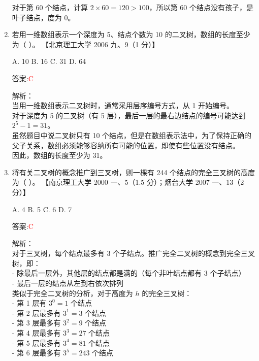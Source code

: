 \documentclass[lang=cn,newtx,10pt,scheme=chinese]{../../../elegantbook}
\begin{document}
\begin{enumerate}
    对于第 60 个结点，计算 $2 \times 60 = 120 > 100$，所以第 60 个结点没有孩子，是叶子结点，度为 0。

    \item 若用一维数组表示一个深度为 5、结点个数为 10 的二叉树，数组的长度至少为（ ）。  
    【北京理工大学 2006 九、9（1 分）】 

    A. 10 \quad B. 16 \quad C. 31 \quad D. 64  

    答案:\textcolor{red}{C}
    
    解析：\\
    当用一维数组表示二叉树时，通常采用层序编号方式，从 1 开始编号。\\
    
    对于深度为 5 的二叉树（有 5 层），最后一层的最右边结点的编号可能达到 $2^5-1 = 31$。\\
    
    虽然题目中说二叉树只有 10 个结点，但是在数组表示法中，为了保持正确的父子关系，数组必须能够容纳所有可能的位置，即使有些位置没有结点。\\
    
    因此，数组的长度至少为 31。

    \item 将有关二叉树的概念推广到三叉树，则一棵有 244 个结点的完全三叉树的高度为（ ）。  
    【南京理工大学 2000 一、5（1.5 分）；烟台大学 2007 一、13（2 分）】 

    A. 4 \quad B. 5 \quad C. 6 \quad D. 7  

    答案:\textcolor{red}{C}
    
    解析：\\
    对于三叉树，每个结点最多有 3 个子结点。推广完全二叉树的概念到完全三叉树，即：\\
    - 除最后一层外，其他层的结点都是满的（每个非叶结点都有 3 个子结点）\\
    - 最后一层的结点从左到右依次排列\\
    
    类似于完全二叉树的分析，对于高度为 $h$ 的完全三叉树：\\
    - 第 1 层有 $3^0 = 1$ 个结点\\
    - 第 2 层最多有 $3^1 = 3$ 个结点\\
    - 第 3 层最多有 $3^2 = 9$ 个结点\\
    - 第 4 层最多有 $3^3 = 27$ 个结点\\
    - 第 5 层最多有 $3^4 = 81$ 个结点\\
    - 第 6 层最多有 $3^5 = 243$ 个结点\\
    

\end{enumerate}
\end{document}
